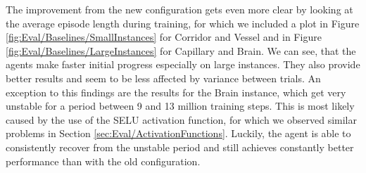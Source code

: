 The improvement from the new configuration gets even more clear by looking at the average episode length during training, for which we included a plot in Figure \ref{fig:Eval/Baselines/SmallInstances} for Corridor and Vessel and in Figure \ref{fig:Eval/Baselines/LargeInstances} for Capillary and Brain. We can see, that the agents make faster initial progress especially on large instances. They also provide better results and seem to be less affected by variance between trials. An exception to this findings are the results for the Brain instance, which get very unstable for a period between 9 and 13 million training steps. This is most likely caused by the use of the SELU activation function, for which we observed similar problems in Section \ref{sec:Eval/ActivationFunctions}. Luckily, the agent is able to consistently recover from the unstable period and still achieves constantly better performance than with the old configuration.

